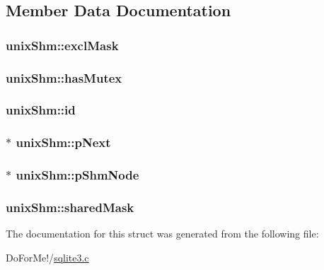 \subsection{Member Data Documentation}
\hypertarget{structunix_shm_ac6f786d95952e51cab941cbfb9243c8e}{
\subsubsection[{excl\-Mask}]{ unix\-Shm\-::excl\-Mask}}\label{structunix_shm_ac6f786d95952e51cab941cbfb9243c8e}
\hypertarget{structunix_shm_a43903be262472299c5eee917ba7c523c}{
\subsubsection[{has\-Mutex}]{ unix\-Shm\-::has\-Mutex}}\label{structunix_shm_a43903be262472299c5eee917ba7c523c}
\hypertarget{structunix_shm_a88a5e7161ff31f85740dbfc0ba7ad38a}{
\subsubsection[{id}]{ unix\-Shm\-::id}}\label{structunix_shm_a88a5e7161ff31f85740dbfc0ba7ad38a}
\hypertarget{structunix_shm_a0d5229cf734581f51cdf16dd7d5ce93a}{
\subsubsection[{p\-Next}]{$\ast$ unix\-Shm\-::p\-Next}}\label{structunix_shm_a0d5229cf734581f51cdf16dd7d5ce93a}
\hypertarget{structunix_shm_a8ab421232d29e3237262ef46775199ee}{
\subsubsection[{p\-Shm\-Node}]{$\ast$ unix\-Shm\-::p\-Shm\-Node}}\label{structunix_shm_a8ab421232d29e3237262ef46775199ee}
\hypertarget{structunix_shm_a768aa62a6ea2bd91ab60a34d7654811b}{
\subsubsection[{shared\-Mask}]{ unix\-Shm\-::shared\-Mask}}\label{structunix_shm_a768aa62a6ea2bd91ab60a34d7654811b}


The documentation for this struct was generated from the following file\-:\begin{DoxyCompactItemize}
\item 
Do\-For\-Me!/\hyperlink{sqlite3_8c}{sqlite3.\-c}\end{DoxyCompactItemize}
